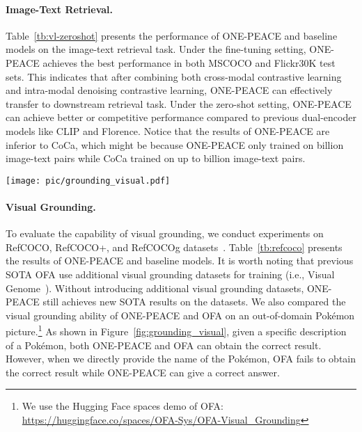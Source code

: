 \documentclass{article}
\newcommand{\onepeace}{ONE-PEACE\xspace}
\begin{document}
\paragraph{Image-Text Retrieval.}
Table~\ref{tb:vl-zeroshot} presents the performance of \onepeace and baseline models on the image-text retrieval task. 
Under the fine-tuning setting, \onepeace achieves the best performance in both MSCOCO and Flickr30K test sets. 
This indicates that after combining both cross-modal contrastive learning and intra-modal denoising contrastive learning, \onepeace can effectively transfer to downstream retrieval task.
Under the zero-shot setting, \onepeace can achieve better or competitive performance compared to previous dual-encoder models like CLIP and Florence.
Notice that the results of \onepeace are inferior to CoCa, which might be because \onepeace only trained on  billion image-text pairs while CoCa trained on up to  billion image-text pairs.


\begin{figure*}[t]
    \centering
    \texttt{[image: pic/grounding\_visual.pdf]}
    \caption{\textbf{Visualization of out-of-domain data in visual grounding task.} When given a specific description, both OFA and ONE-PEACE can give the correct result. However, OFA is unable to locate the correct region if we directly provide the name of the Pokémon, while ONE-PEACE can give a correct answer.}
    \label{fig:grounding_visual}
    \vspace{+1em}
\end{figure*}

\paragraph{Visual Grounding.}
To evaluate the capability of visual grounding, we conduct experiments on RefCOCO, RefCOCO+, and RefCOCOg datasets~\cite{refcoco,refcocog}. 
Table~\ref{tb:refcoco} presents the results of \onepeace and baseline models. 
It is worth noting that previous SOTA OFA use additional visual grounding datasets for training (i.e., Visual Genome~\cite{vg}). 
Without introducing additional visual grounding datasets, \onepeace still achieves new SOTA results on the  datasets. 
We also compared the visual grounding ability of \onepeace and OFA on an out-of-domain Pokémon picture.\footnote{We use the Hugging Face spaces demo of OFA: \url{https://huggingface.co/spaces/OFA-Sys/OFA-Visual\_Grounding}} 
As shown in Figure~\ref{fig:grounding_visual}, given a specific description of a Pokémon, both \onepeace and OFA can obtain the correct result. 
However, when we directly provide the name of the Pokémon, OFA fails to obtain the correct result while ONE-PEACE can give a correct answer.
\end{document}
